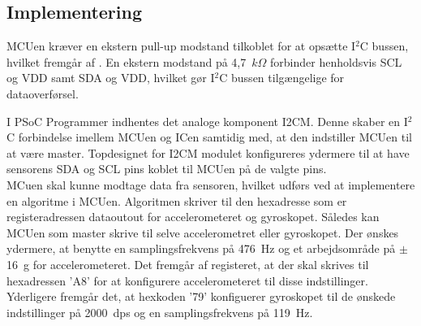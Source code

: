 \subsection{Implementering}
MCUen kræver en ekstern pull-up modstand tilkoblet for at opsætte I$^{2}$C bussen, hvilket fremgår af . En ekstern modstand på 4,7~$k\Omega$ forbinder henholdsvis SCL og VDD samt SDA og VDD, hvilket gør I$^{2}$C bussen tilgængelige for dataoverførsel.

I PSoC Programmer indhentes det analoge komponent I2CM. Denne skaber en I$^2$C forbindelse imellem MCUen og ICen samtidig med, at den indstiller MCUen til at være master. %
Topdesignet for I2CM modulet konfigureres ydermere til at have sensorens SDA og SCL pins koblet til MCUen på de valgte pins.\\
MCuen skal kunne modtage data fra sensoren, hvilket udførs ved at implementere en algoritme i MCUen. Algoritmen skriver til den hexadresse som er registeradressen dataoutout for accelerometeret og gyroskopet. Således kan MCUen som master skrive til selve accelerometret eller gyroskopet. Der ønskes ydermere, at benytte en samplingsfrekvens på 476~Hz og et arbejdsområde på $\pm$16~g for accelerometeret. Det fremgår af registeret, at der skal skrives til hexadressen 'A8' for at konfigurere accelerometeret til disse indstillinger. \\
Yderligere fremgår det, at hexkoden '79' konfiguerer gyroskopet til de ønskede indstillinger på 2000~dps og en samplingsfrekvens på 119~Hz. \citep{STMicroelectronics2016}


